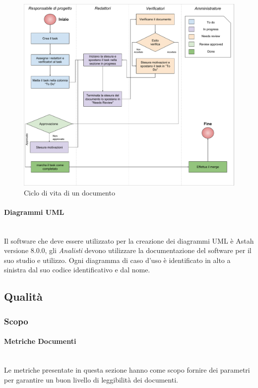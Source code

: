 \begin{figure}[H]
\centering
\includegraphics[width=17cm,trim=2 2 2 2, clip]{img/cicloVitaDocumentoAsana.pdf}
\caption{Ciclo di vita di un documento}
\label{fig:document_lifecycle}
\end{figure}

\paragraph{Diagrammi UML}\mbox{}\\
Il software che deve essere utilizzato per la creazione dei diagrammi UML è Astah versione 8.0.0, gli \textit{Analisti} devono utilizzare la documentazione del software per il suo studio e utilizzo.
Ogni diagramma di caso d’uso è identificato in alto a sinistra dal suo codice identificativo e dal nome.

\subsection{Qualità}
\subsubsection{Scopo}
\paragraph{Metriche Documenti}\mbox{}\\
Le metriche presentate in questa sezione hanno come scopo fornire dei parametri per garantire un buon livello di leggibilità dei documenti.

